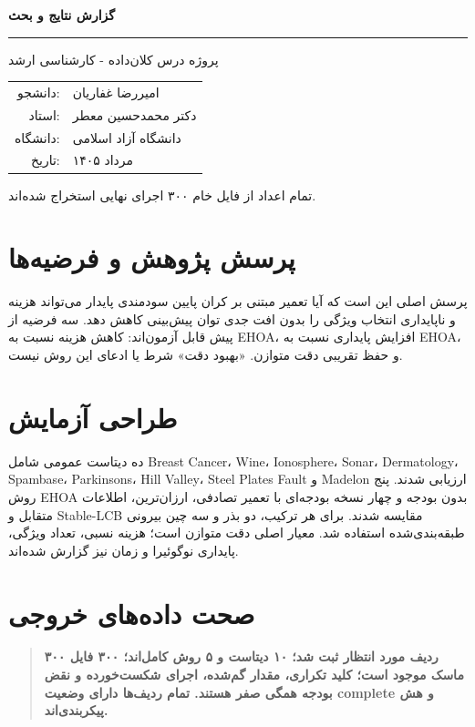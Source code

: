 \documentclass[12pt,a4paper]{article}
\newcommand{\lr}[1]{\foreignlanguage{english}{#1}}
\newenvironment{resultbox}{\begin{quote}\color{navy}\bfseries}{\end{quote}}
\begin{document}
\begin{titlepage}\pagecolor{navy}\color{white}\centering\vspace*{2.2cm}
{\Huge\bfseries گزارش نتایج و بحث\par}\vspace{.7cm}{\LARGE ارزیابی تأییدی انتخاب ویژگی هزینه‌آگاه و پایدار\par}\vspace{1.4cm}\rule{.8\textwidth}{1pt}\vfill
{\Large پروژه درس کلان‌داده - کارشناسی ارشد\par}\vspace{1cm}
\begin{tabular}{rl}دانشجو: & امیررضا غفاریان\\ استاد: & دکتر محمدحسین معطر\\ دانشگاه: & دانشگاه آزاد اسلامی\\ تاریخ: & مرداد ۱۴۰۵\end{tabular}\vfill
\color{white!80}تمام اعداد از فایل خام ۳۰۰ اجرای نهایی استخراج شده‌اند.\end{titlepage}
\nopagecolor\color{black}\tableofcontents\newpage
\section{پرسش پژوهش و فرضیه‌ها}
پرسش اصلی این است که آیا تعمیر مبتنی بر کران پایین سودمندی پایدار می‌تواند هزینه و ناپایداری انتخاب ویژگی را بدون افت جدی توان پیش‌بینی کاهش دهد. سه فرضیه از پیش قابل آزمون‌اند: کاهش هزینه نسبت به EHOA، افزایش پایداری نسبت به EHOA، و حفظ تقریبی دقت متوازن. «بهبود دقت» شرط یا ادعای این روش نیست.

\section{طراحی آزمایش}
ده دیتاست عمومی شامل \lr{Breast Cancer}، \lr{Wine}، \lr{Ionosphere}، \lr{Sonar}، \lr{Dermatology}، \lr{Spambase}، \lr{Parkinsons}، \lr{Hill Valley}، \lr{Steel Plates Fault} و \lr{Madelon} ارزیابی شدند. پنج روش EHOA بدون بودجه و چهار نسخه بودجه‌ای با تعمیر تصادفی، ارزان‌ترین، اطلاعات متقابل و \lr{Stable-LCB} مقایسه شدند. برای هر ترکیب، دو بذر و سه چین بیرونی طبقه‌بندی‌شده استفاده شد. معیار اصلی دقت متوازن است؛ هزینه نسبی، تعداد ویژگی، پایداری نوگوئیرا و زمان نیز گزارش شده‌اند.

\section{صحت داده‌های خروجی}
\begin{resultbox}
۳۰۰ ردیف مورد انتظار ثبت شد؛ ۱۰ دیتاست و ۵ روش کامل‌اند؛ ۳۰۰ فایل ماسک موجود است؛ کلید تکراری، مقدار گم‌شده، اجرای شکست‌خورده و نقض بودجه همگی صفر هستند. تمام ردیف‌ها دارای وضعیت \lr{complete} و هش پیکربندی‌اند.
\end{resultbox}
\end{document}
